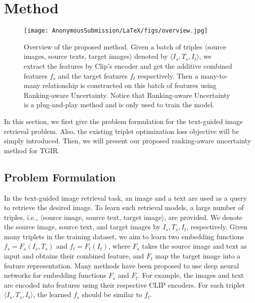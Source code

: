 \documentclass[letterpaper]{article} \usepackage{aaai24}  \usepackage{times}  \usepackage{helvet}  \usepackage{courier}  \usepackage[hyphens]{url}  \usepackage{graphicx} \urlstyle{rm} \def\UrlFont{\rm}  \usepackage{natbib}  \usepackage{caption} \frenchspacing  \setlength{\pdfpagewidth}{8.5in} \setlength{\pdfpageheight}{11in} \usepackage{amsmath,amsfonts}
\begin{document}
\section{Method}

\begin{figure*}
    \centering
    \texttt{[image: AnonymousSubmission/LaTeX/figs/overview.jpg]}
    \caption{Overview of the proposed method. Given a batch of triples $\langle$source images, source texts, target images$\rangle$ denoted by $\langle I_s, T_s, I_t \rangle$, we extract the features by Clip's encoder and get the additive combined features $f_s$ and the target features $f_t$ respectively. Then a many-to-many relationship is constructed on this batch of features using Ranking-aware Uncertainty. Notice that Ranking-aware Uncertainty is a plug-and-play method and is only used to train the model.}
    \label{fig:overview}
\end{figure*}

In this section, we first give the problem formulation for the text-guided image retrieval problem.  Also, the existing triplet optimization loss objective will be simply introduced. Then, we will present our proposed ranking-aware uncertainty method for TGIR. 

\subsection{Problem Formulation}
In the text-guided image retrieval task, an image and a text are used as a query to retrieve the desired image. To learn such retrieval models, a large number of triples, i.e., $\langle$source image, source text, target image$\rangle$, are provided. We denote the source image, source text, and target images by $I_s, T_s, I_t$, respectively. Given many triplets in the training dataset, we aim to learn two embedding functions $f_s = F_s(I_s,T_s)$ and $f_t=F_t(I_t)$, where $F_s$ takes the source image and text as input and obtains their combined feature, and $F_t$ map the target image into a feature representation. Many methods have been proposed to use deep neural networks for embedding functions $F_s$ and $F_t$. For example, the images and text are encoded into features using their respective CLIP encoders. For each triplet  $\langle I_s, T_s, I_t \rangle$, the learned $f_s$ should be similar to $f_t$.
\end{document}
